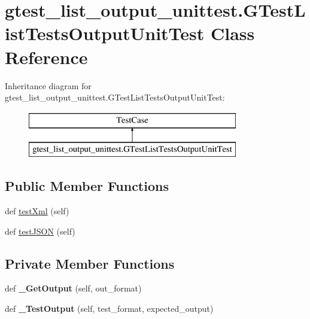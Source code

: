 \hypertarget{classgtest__list__output__unittest_1_1_g_test_list_tests_output_unit_test}{}\section{gtest\+\_\+list\+\_\+output\+\_\+unittest.\+G\+Test\+List\+Tests\+Output\+Unit\+Test Class Reference}
\label{classgtest__list__output__unittest_1_1_g_test_list_tests_output_unit_test}
Inheritance diagram for gtest\+\_\+list\+\_\+output\+\_\+unittest.\+G\+Test\+List\+Tests\+Output\+Unit\+Test\+:\begin{figure}[H]
\begin{center}
\leavevmode
\includegraphics[height=2.000000cm]{classgtest__list__output__unittest_1_1_g_test_list_tests_output_unit_test}
\end{center}
\end{figure}
\subsection*{Public Member Functions}
\begin{DoxyCompactItemize}
\item 
def \mbox{\hyperlink{classgtest__list__output__unittest_1_1_g_test_list_tests_output_unit_test_ad3088bc8ee3a0abdabbf1b90507e272e}{test\+Xml}} (self)
\item 
def \mbox{\hyperlink{classgtest__list__output__unittest_1_1_g_test_list_tests_output_unit_test_a99bc0627a969b4c7b63ed91e8f187637}{test\+J\+S\+ON}} (self)
\end{DoxyCompactItemize}
\subsection*{Private Member Functions}
\begin{DoxyCompactItemize}
\item 
\mbox{\label{classgtest__list__output__unittest_1_1_g_test_list_tests_output_unit_test_a1b4015d0e1778e9d51e8e6c0e4e2a509}} 
def {\bfseries \+\_\+\+Get\+Output} (self, out\+\_\+format)
\item 
\mbox{\label{classgtest__list__output__unittest_1_1_g_test_list_tests_output_unit_test_aa55917904d9c888f566fbf5cac1e63ac}} 
def {\bfseries \+\_\+\+Test\+Output} (self, test\+\_\+format, expected\+\_\+output)
\end{DoxyCompactItemize}


